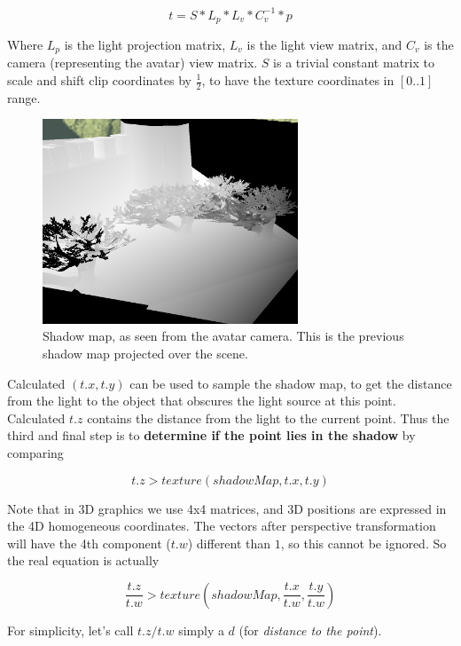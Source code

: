 \documentclass{acmsiggraph}                     %
\begin{document}
\begin{equation}
  t = S * L_p * L_v * C_v^{-1} * p
\end{equation}

Where $L_p$ is the light projection matrix, $L_v$ is the light view
matrix, and $C_v$ is the camera (representing the avatar)
view matrix. $S$ is a trivial constant matrix to scale and shift clip coordinates
by $\frac{1}{2}$, to have the texture coordinates in $[0..1]$ range.

\begin{figure}[H]
  \centering
  \includegraphics[width=3in]{depths_camera_mapped}
  \caption{Shadow map, as seen from the avatar camera. This is the previous shadow map projected over the scene.}
\end{figure}

Calculated $(t.x, t.y)$ can be used to sample the shadow map,
to get the distance from the light to the object that obscures the light
source at this point. Calculated $t.z$ contains the distance from the light
to the current point. Thus the third and final step is to
\textbf{determine if the point lies in the shadow} by comparing

\begin{equation}
  t.z > texture(shadowMap, t.x, t.y)
\end{equation}

Note that in 3D graphics we use 4x4 matrices,
and 3D positions are expressed in the 4D homogeneous coordinates.
The vectors after perspective transformation will have the 4th component ($t.w$)
different than $1$, so this cannot be ignored.
So the real equation is actually

\begin{equation}
  \frac{t.z}{t.w} > texture(shadowMap, \frac{t.x}{t.w}, \frac{t.y}{t.w})
\end{equation}

For simplicity, let's call $t.z/t.w$ simply a $d$ (for \textit{distance to the point}).
\end{document}

